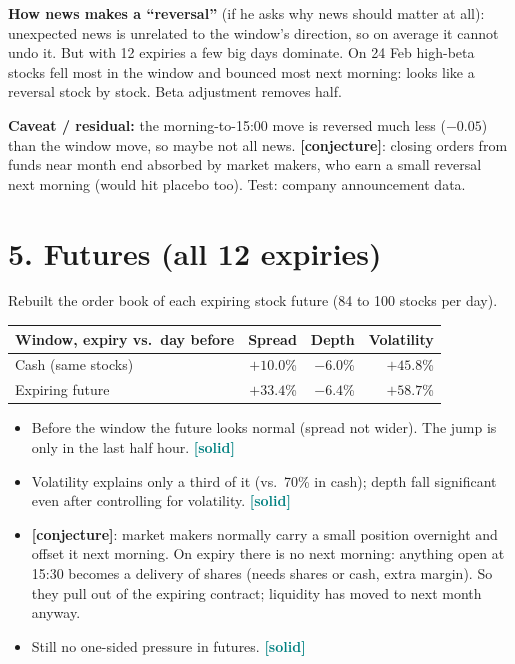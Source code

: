 \documentclass[11pt]{article}
\newcommand{\solid}{\textcolor{teal}{\textbf{[solid]}}}
\newcommand{\guess}{\textcolor{orange!80!black}{\textbf{[conjecture]}}}
\begin{document}
\textbf{How news makes a ``reversal''} (if he asks why news should matter at all): unexpected
news is unrelated to the window's direction, so on average it cannot undo it. But with 12
expiries a few big days dominate. On 24 Feb high-beta stocks fell most in the window and bounced
most next morning: looks like a reversal stock by stock. Beta adjustment removes half.

\textbf{Caveat / residual:} the morning-to-15:00 move is reversed much less ($-0.05$) than the
window move, so maybe not all news. \guess: closing orders from funds near month end absorbed by
market makers, who earn a small reversal next morning (would hit placebo too). Test: company
announcement data.

\section*{5. Futures (all 12 expiries)}
Rebuilt the order book of each expiring stock future (84 to 100 stocks per day).
\begin{center}
\small
\begin{tabular}{lrrr}
\toprule
Window, expiry vs.\ day before & Spread & Depth & Volatility \\
\midrule
Cash (same stocks) & $+10.0$\% & $-6.0$\% & $+45.8$\% \\
Expiring future & $+33.4$\% & $-6.4$\% & $+58.7$\% \\
\bottomrule
\end{tabular}
\end{center}
\begin{itemize}
  \item Before the window the future looks normal (spread not wider). The jump is only in the
  last half hour. \solid
  \item Volatility explains only a third of it (vs.\ 70\% in cash); depth fall significant even
  after controlling for volatility. \solid
  \item \guess: market makers normally carry a small position overnight and offset it next
  morning. On expiry there is no next morning: anything open at 15:30 becomes a delivery of
  shares (needs shares or cash, extra margin). So they pull out of the expiring contract;
  liquidity has moved to next month anyway.
  \item Still no one-sided pressure in futures. \solid
\end{itemize}
\end{document}
